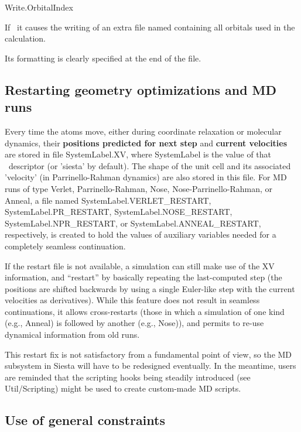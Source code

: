 \begin{fdflogicalT}{Write.OrbitalIndex}

  If \fdftrue\ it causes the writing of an extra file
  named  containing all orbitals used in the
  calculation.

  Its formatting is clearly specified at the end of the file.
  
\end{fdflogicalT}


\subsection{Restarting geometry optimizations and MD runs}

Every time the atoms move, either during coordinate relaxation or
molecular dynamics, their \textbf{positions predicted for next step} and
\textbf{current velocities} are stored in file SystemLabel.XV, where
SystemLabel is the value of that \fdflib\ descriptor (or 'siesta' by
default).  The shape of the unit cell and its associated 'velocity'
(in Parrinello-Rahman dynamics) are also stored in this file. For MD
runs of type Verlet, Parrinello-Rahman, Nose, 
Nose-Parrinello-Rahman, or Anneal, a file named SystemLabel.VERLET\_RESTART,
SystemLabel.PR\_RESTART, SystemLabel.NOSE\_RESTART, 
SystemLabel.NPR\_RESTART, or SystemLabel.ANNEAL\_RESTART, 
respectively, is created to hold the values
of auxiliary variables needed for a completely seamless
continuation. 

If the restart file is not available, a simulation can still make use
of the XV information, and ``restart'' by basically repeating the
last-computed step (the positions are shifted backwards by using a
single Euler-like step with the current velocities as derivatives).
While this feature does not result in seamless continuations, it
allows cross-restarts (those in which a simulation of one kind (e.g.,
Anneal) is followed by another (e.g., Nose)), and permits 
to re-use dynamical information from old runs.

This restart fix is not satisfactory from a fundamental point of view,
so the MD subsystem in Siesta will have to be redesigned
eventually. In the meantime, users are reminded that the scripting
hooks being steadily introduced (see Util/Scripting) might be used to
create custom-made MD scripts.


\subsection{Use of general constraints}

